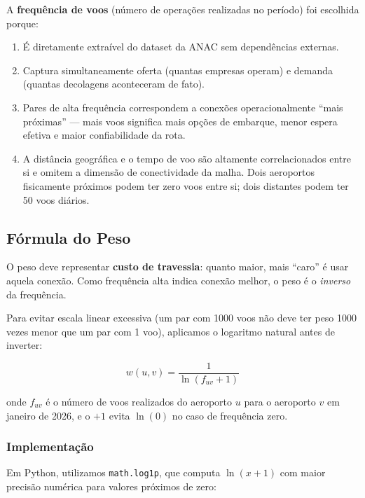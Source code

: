 \documentclass[12pt,a4paper]{article}
\begin{document}
A \textbf{frequência de voos} (número de operações realizadas no período) foi escolhida porque:

\begin{enumerate}
    \item É diretamente extraível do dataset da ANAC sem dependências externas.
    \item Captura simultaneamente oferta (quantas empresas operam) e demanda (quantas decolagens
          aconteceram de fato).
    \item Pares de alta frequência correspondem a conexões operacionalmente ``mais próximas'' ---
          mais voos significa mais opções de embarque, menor espera efetiva e maior confiabilidade
          da rota.
    \item A distância geográfica e o tempo de voo são altamente correlacionados entre si e omitem
          a dimensão de conectividade da malha. Dois aeroportos fisicamente próximos podem ter
          zero voos entre si; dois distantes podem ter 50 voos diários.
\end{enumerate}

\subsection{Fórmula do Peso}

O peso deve representar \textbf{custo de travessia}: quanto maior, mais ``caro'' é usar aquela
conexão. Como frequência alta indica conexão melhor, o peso é o \emph{inverso} da frequência.

Para evitar escala linear excessiva (um par com 1000 voos não deve ter peso 1000 vezes menor que
um par com 1 voo), aplicamos o logaritmo natural antes de inverter:

\begin{equation}
    w(u, v) = \frac{1}{\ln(f_{uv} + 1)}
    \label{eq:peso}
\end{equation}

onde $f_{uv}$ é o número de voos realizados do aeroporto $u$ para o aeroporto $v$ em janeiro de 2026,
e o $+1$ evita $\ln(0)$ no caso de frequência zero.

\subsubsection{Implementação}

Em Python, utilizamos \texttt{math.log1p}, que computa $\ln(x+1)$ com maior precisão numérica para
valores próximos de zero:
\end{document}
